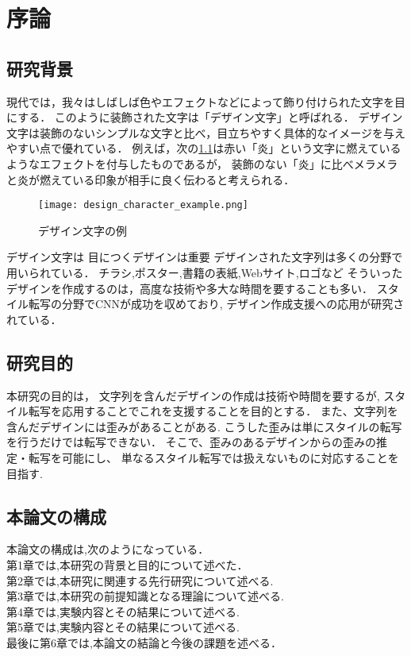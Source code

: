 \documentclass[\homedir/main.tex]{subfiles}
\begin{document}
\setcounter{chapter}{0}
\chapter{序論}\label{sec:introduction}
\section{研究背景}
現代では，我々はしばしば色やエフェクトなどによって飾り付けられた文字を目にする．
このように装飾された文字は「デザイン文字」と呼ばれる．
デザイン文字は装飾のないシンプルな文字と比べ，目立ちやすく具体的なイメージを与えやすい点で優れている．
例えば，次の\cref{fig:design_char_ex}は赤い「炎」という文字に燃えているようなエフェクトを付与したものであるが，
装飾のない「炎」に比べメラメラと炎が燃えている印象が相手に良く伝わると考えられる．

\begin{figure}[ht]
    \centering
    \texttt{[image: design\_character\_example.png]}
    \caption{デザイン文字の例}
    \label{fig:design_char_ex}
\end{figure}

デザイン文字は
目につくデザインは重要
デザインされた文字列は多くの分野で用いられている．
チラシ,ポスター,書籍の表紙,Webサイト,ロゴなど
そういったデザインを作成するのは，高度な技術や多大な時間を要することも多い．
スタイル転写の分野でCNNが成功を収めており,
デザイン作成支援への応用が研究されている．

\section{研究目的}
本研究の目的は，
文字列を含んだデザインの作成は技術や時間を要するが,
スタイル転写を応用することでこれを支援することを目的とする．
また、文字列を含んだデザインには歪みがあることがある.
こうした歪みは単にスタイルの転写を行うだけでは転写できない．
そこで、歪みのあるデザインからの歪みの推定・転写を可能にし、
単なるスタイル転写では扱えないものに対応することを目指す.

\section{本論文の構成}
本論文の構成は,次のようになっている．\\
第1章では,本研究の背景と目的について述べた．\\
第2章では,本研究に関連する先行研究について述べる.\\
第3章では,本研究の前提知識となる理論について述べる.\\
第4章では,実験内容とその結果について述べる.\\
第5章では,実験内容とその結果について述べる.\\
最後に第6章では,本論文の結論と今後の課題を述べる．

\printBibForSubfiles
\end{document}
